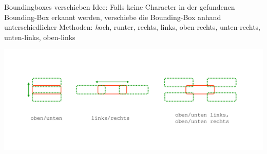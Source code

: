 \begin{frame}{Boundingboxes verschieben}
Idee: Falls keine Character in der gefundenen Bounding-Box erkannt werden, verschiebe die Bounding-Box anhand unterschiedlicher Methoden: {\textit hoch, runter, rechts, links, oben-rechts, unten-rechts, unten-links, oben-links}
\begin{center}
    \includegraphics[width=\textwidth]{img/bbox_shift}
\end{center}
\end{frame}
